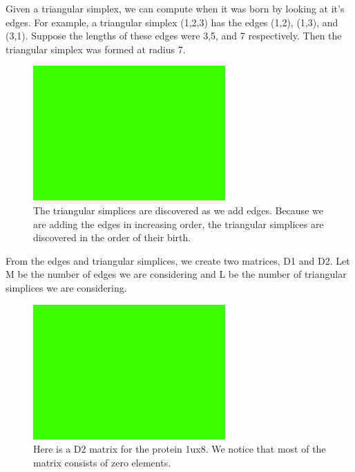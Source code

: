 \documentclass[12pt, a4paper, twocolumn, fullpage]{article}
\theoremstyle{plain}
\theoremstyle{definition}
\theoremstyle{remark}
\begin{document}
Given a triangular simplex, we can compute when it was born by looking at it's edges. For example, a triangular simplex (1,2,3) has the edges (1,2), (1,3), and (3,1). Suppose the lengths of these edges were 3,5, and 7 respectively. Then the triangular simplex was formed at radius 7. 

\begin{figure}[t]
    \includegraphics[width=\linewidth]{img/blank.png}
    \caption{The triangular simplices are discovered as we add edges. Because we are adding the edges in increasing order, the triangular simplices are discovered in the order of their birth.}
    \label{Simplex formation algorithm}
\end{figure}

From the edges and triangular simplices, we create two matrices, D1 and D2. Let M be the number of edges we are considering and L be the number of triangular simplices we are considering.

\begin{figure}[t]
    \includegraphics[width=\linewidth]{img/blank.png}
    \caption{Here is a D2 matrix for the protein 1ux8. We notice that most of the matrix consists of zero elements. }
    \label{D2Mat}
\end{figure}
\end{document}
